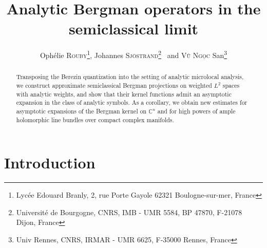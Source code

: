 \documentclass{article}
\title{Analytic Bergman operators in the semiclassical limit}
\author{Ophélie \textsc{Rouby}\footnote{Lycée Edouard Branly, 2, rue
    Porte Gayole 62321 Boulogne-sur-mer, France}, Johannes
  \textsc{Sjöstrand}\footnote{Université de Bourgogne, CNRS, IMB - UMR
    5584, BP 47870, F-21078 Dijon, France}~ and \textsc{V\~u Ng\d oc}
  San\footnote{Univ Rennes, CNRS, IRMAR - UMR 6625, F-35000 Rennes,
    France}}
\date{}
\newcommand{\CM}{\mathbb{C}}
\begin{document}

\maketitle

\begin{abstract}
  Transposing the Berezin quantization into the setting of analytic
  microlocal analysis, we construct approximate semiclassical Bergman
  projections on weighted $L^2$ spaces with analytic weights, and show
  that their kernel functions admit an asymptotic expansion in the
  class of analytic symbols. As a corollary, we obtain new estimates
  for asymptotic expansions of the Bergman kernel on $\CM^n$ and for
  high powers of ample holomorphic line bundles over compact complex
  manifolds.
\end{abstract}
\maketitle

\section{Introduction}
\end{document}
